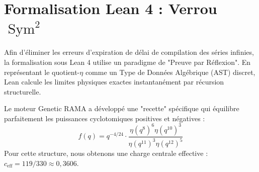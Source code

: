 \section{Formalisation Lean 4 : Verrou $\operatorname{Sym}^{2}$}
Afin d'éliminer les erreurs d'expiration de délai de compilation des séries infinies, la formalisation sous Lean 4 utilise un paradigme de "Preuve par Réflexion". En représentant le quotient-$\eta$ comme un Type de Données Algébrique (AST) discret, Lean calcule les limites physiques exactes instantanément par récursion structurelle.

Le moteur Genetic RAMA a développé une "recette" spécifique qui équilibre parfaitement les puissances cyclotomiques positives et négatives :
\begin{equation}
f(q) = q^{-4/24} \cdot \frac{\eta(q^8)^6 \eta(q^{10})^3}{\eta(q^{11})^3 \eta(q^{12})^5}
\end{equation}
Pour cette structure, nous obtenons une charge centrale effective : $c_{\mathrm{eff}} = 119/330 \approx 0,3606$.
